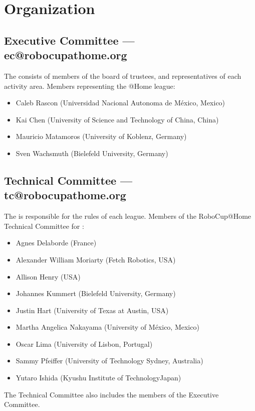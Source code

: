 \section{Organization}

\subsection{Executive Committee --- ec@robocupathome.org}
\label{sec:ec}
The  consists of members of the board of trustees, and representatives of each activity area. Members representing the @Home league:
\begin{itemize}
	\item Caleb Rascon (Universidad Nacional Autonoma de México, Mexico)
	\item Kai Chen (University of Science and Technology of China, China)
	\item Mauricio Matamoros (University of Koblenz, Germany)
	\item Sven Wachsmuth (Bielefeld University, Germany)
\end{itemize}

\subsection{Technical Committee --- tc@robocupathome.org}
\label{sec:tc}
The  is responsible for the rules of each league. Members of the RoboCup@Home Technical Committee for \YEAR:
\begin{itemize}
	\item Agnes Delaborde (France)
	\item Alexander William Moriarty (Fetch Robotics, USA)
	\item Allison Henry (USA)
	\item Johannes Kummert (Bielefeld University, Germany)
	\item Justin Hart (University of Texas at Austin, USA)
	\item Martha Angelica Nakayama (University of México, Mexico)
	\item Oscar Lima (University of Lisbon, Portugal)
	\item Sammy Pfeiffer (University of Technology Sydney, Australia)
	\item Yutaro Ishida (Kyushu Institute of TechnologyJapan)
\end{itemize}
The Technical Committee also includes the members of the Executive Committee.

